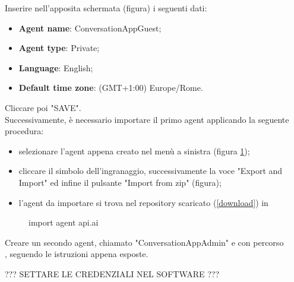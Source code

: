 Inserire nell'apposita schermata (figura) i seguenti dati:
\begin{itemize}
	\item \textbf{Agent name}: ConversationAppGuest;
	\item \textbf{Agent type}: Private;
	\item \textbf{Language}: English;
	\item \textbf{Default time zone}: (GMT+1:00) Europe/Rome.
\end{itemize}
Cliccare poi "SAVE".\\
Successivamente, è necessario importare il primo agent applicando la seguente procedura:
\begin{itemize}
	\item selezionare l'agent appena creato nel menù a sinistra (figura \ref{fig:menuapi});
	\item cliccare il simbolo dell'ingranaggio, successivamente la voce "Export and Import" ed infine il pulsante "Import from zip" (figura);
	\item l'agent da importare si trova nel repository scaricato (\ref{download}) in\\ 
\end{itemize}
\begin{figure}[h]\label{fig:menuapi}
	\caption{import agent api.ai}
\end{figure}

Creare un secondo agent, chiamato "ConversationAppAdmin" e con percorso\\ , seguendo le istruzioni appena esposte.

??? SETTARE LE CREDENZIALI NEL SOFTWARE ???


